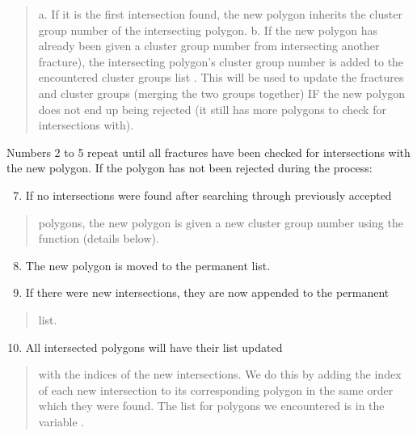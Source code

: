 \documentclass[letterpaper,10pt,english]{sphinxmanual}
\begin{document}
\begin{quote}

a.   If it is the first intersection found, the new polygon inherits the
cluster group number of the intersecting polygon.  b.        If the new polygon
has already been given a cluster group number from intersecting another
fracture), the intersecting polygon’s cluster group number is added to the
encountered cluster groups list . This will be used to
update the fractures and cluster groups (merging the two groups together) IF
the new polygon does not end up being rejected (it still has more polygons to
check for intersections with).
\end{quote}

Numbers 2 to 5 repeat until all fractures have been checked for intersections
with the new polygon. If the polygon has not been rejected during the process:
\begin{enumerate}
\setcounter{enumi}{6}
\item {} 
If no intersections were found after searching through previously accepted

\end{enumerate}
\begin{quote}

polygons, the new polygon is given a new cluster group number using the
 function (details below).
\end{quote}
\begin{enumerate}
\setcounter{enumi}{7}
\item {} 
The new polygon is moved to the permanent  list.

\item {} 
If there were new intersections, they are now appended to the permanent

\end{enumerate}
\begin{quote}

 list.
\end{quote}
\begin{enumerate}
\setcounter{enumi}{9}
\item {} 
All intersected polygons will have their  list updated

\end{enumerate}
\begin{quote}

with the indices of the new intersections. We do this by adding the index of
each new intersection to its corresponding polygon in the same order which
they were found. The list for polygons we encountered is in the variable
.
\end{quote}
\end{document}
